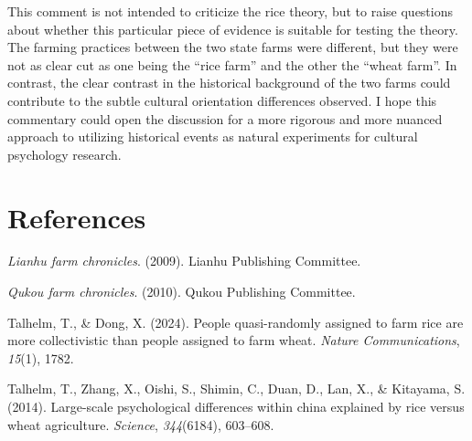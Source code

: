 \documentclass[
  man]{apa6}
\newlength{\cslhangindent}
\newlength{\cslentryspacingunit} %
\newenvironment{CSLReferences}[2] %
 {%
  \setlength{\parindent}{0pt}
  \ifodd #1
  \let\oldpar\par
  \def\par{\hangindent=\cslhangindent\oldpar}
  \fi
  \setlength{\parskip}{#2\cslentryspacingunit}
 }%
 {}
\begin{document}
This comment is not intended to criticize the rice theory, but to raise questions about whether this particular piece of evidence is suitable for testing the theory. The farming practices between the two state farms were different, but they were not as clear cut as one being the ``rice farm'' and the other the ``wheat farm''. In contrast, the clear contrast in the historical background of the two farms could contribute to the subtle cultural orientation differences observed. I hope this commentary could open the discussion for a more rigorous and more nuanced approach to utilizing historical events as natural experiments for cultural psychology research.

\newpage

\hypertarget{references}{%
\section{References}\label{references}}

\hypertarget{refs}{}
\begin{CSLReferences}{1}{0}
\leavevmode{}%
\emph{Lianhu farm chronicles}. (2009). Lianhu Publishing Committee.

\leavevmode{}%
\emph{Qukou farm chronicles}. (2010). Qukou Publishing Committee.

\leavevmode{}%
Talhelm, T., \& Dong, X. (2024). People quasi-randomly assigned to farm rice are more collectivistic than people assigned to farm wheat. \emph{Nature Communications}, \emph{15}(1), 1782.

\leavevmode{}%
Talhelm, T., Zhang, X., Oishi, S., Shimin, C., Duan, D., Lan, X., \& Kitayama, S. (2014). Large-scale psychological differences within china explained by rice versus wheat agriculture. \emph{Science}, \emph{344}(6184), 603--608.

\end{CSLReferences}
\end{document}
